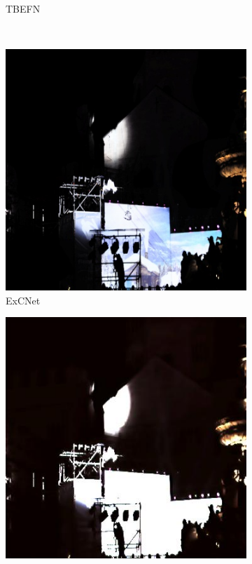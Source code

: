 \documentclass[a4paper]{ctexart}
\begin{document}
\begin{figure}[htb]
\begin{subfigure}{0.19\textwidth}
				\captionsetup{font=scriptsize}
				\caption{TBEFN}
				\label{fig: TBEFN2}
			\end{subfigure}\\
			\begin{subfigure}{0.19\textwidth}
				\includegraphics[width=\linewidth]{picture/LLIE/Experiment/ExCNet2}
				\captionsetup{font=scriptsize}
				\caption{ExCNet}
				\label{fig: ExCNet2}
			\end{subfigure}
			\begin{subfigure}{0.19\textwidth}
				\includegraphics[width=\linewidth]{picture/LLIE/Experiment/RUAS2}

\end{subfigure}
\end{figure}
\end{document}
